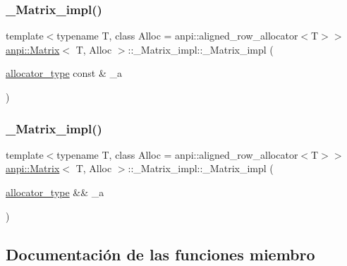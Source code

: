 \subsubsection{\texorpdfstring{\+\_\+\+Matrix\+\_\+impl()}{\_Matrix\_impl()}\hspace{0.1cm}{\footnotesize\ttfamily [2/3]}}
{\footnotesize\ttfamily template$<$typename T, class Alloc = anpi\+::aligned\+\_\+row\+\_\+allocator$<$\+T$>$$>$ \\
\hyperlink{classanpi_1_1Matrix}{anpi\+::\+Matrix}$<$ T, Alloc $>$\+::\+\_\+\+Matrix\+\_\+impl\+::\+\_\+\+Matrix\+\_\+impl (\begin{DoxyParamCaption}\item[{\hyperlink{classanpi_1_1Matrix_a3574b7528e3ddfb2f7cdf446be8286c1}{allocator\+\_\+type} const \&}]{\+\_\+a }\end{DoxyParamCaption})\hspace{0.3cm}{\ttfamily [noexcept]}}

\mbox{\label{structanpi_1_1Matrix_1_1__Matrix__impl_a6d2a88ab7ffecd955a5d624f38e96752}} 
\subsubsection{\texorpdfstring{\+\_\+\+Matrix\+\_\+impl()}{\_Matrix\_impl()}\hspace{0.1cm}{\footnotesize\ttfamily [3/3]}}
{\footnotesize\ttfamily template$<$typename T, class Alloc = anpi\+::aligned\+\_\+row\+\_\+allocator$<$\+T$>$$>$ \\
\hyperlink{classanpi_1_1Matrix}{anpi\+::\+Matrix}$<$ T, Alloc $>$\+::\+\_\+\+Matrix\+\_\+impl\+::\+\_\+\+Matrix\+\_\+impl (\begin{DoxyParamCaption}\item[{\hyperlink{classanpi_1_1Matrix_a3574b7528e3ddfb2f7cdf446be8286c1}{allocator\+\_\+type} \&\&}]{\+\_\+a }\end{DoxyParamCaption})\hspace{0.3cm}{\ttfamily [noexcept]}}



\subsection{Documentación de las funciones miembro}
\mbox{\label{structanpi_1_1Matrix_1_1__Matrix__impl_ac7fa3cfa2d4ee9e2a1f9b77671169601}} 
